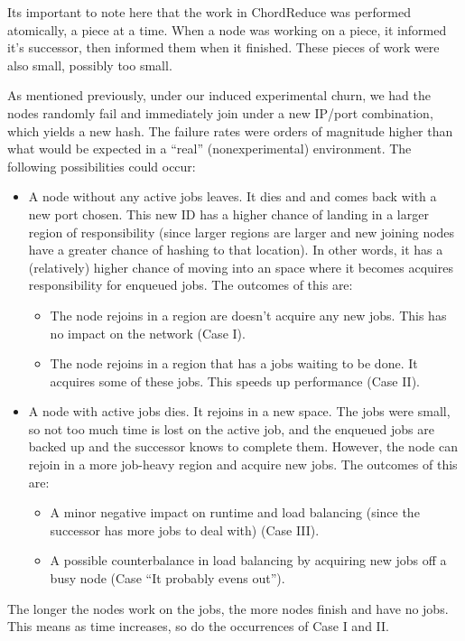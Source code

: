 Its important to note here that the work in ChordReduce was performed atomically, a piece at a time.
When a node was working on a piece, it informed it's successor, then informed them when it finished.
These pieces of work were also small, possibly too small.

As mentioned previously, under our induced experimental churn, we had the nodes randomly fail and immediately join under a new IP/port combination, which yields a new hash.
The failure rates were orders of magnitude higher than what would be expected in a ``real'' (nonexperimental) environment.
The following possibilities could occur:
\begin{itemize}
	\item A node without any active jobs leaves.
	It dies and and comes back with a new port chosen.
	This new ID has a higher chance of landing in a larger region of responsibility (since larger regions are larger and new joining nodes have a greater chance of hashing to that location).
	In other words, it has a (relatively) higher chance of moving into an space where it becomes acquires responsibility for enqueued jobs.
	The outcomes of this are:
	\begin{itemize}
		\item The node rejoins in a region are doesn't acquire any new jobs.
		This has no impact on the network (Case I).
		\item The node rejoins in a region that has a jobs waiting to be done.
		It acquires some of these jobs.
		This speeds up performance (Case II).
	\end{itemize}
	\item A node with active jobs dies.
	It rejoins in a new space.
	The jobs were small, so not too much time is lost on the active job, and the enqueued jobs are backed up and the successor knows to complete them.
	However, the node can rejoin in a more job-heavy region and acquire new jobs.
	The outcomes of this are:
	\begin{itemize}
		\item A minor negative impact on runtime and load balancing (since the successor has more jobs to deal with) (Case III).
		\item A possible counterbalance in load balancing by acquiring new jobs off a busy node (Case ``It probably evens out'').
	\end{itemize}
\end{itemize}

The longer the nodes work on the jobs, the more nodes finish and have no jobs.
This means as time increases, so do the occurrences of Case I and II.


